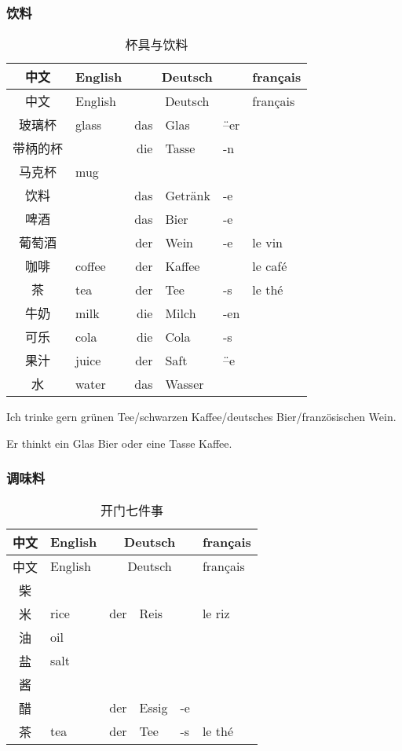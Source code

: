 \documentclass[12pt,A4paper,oneside,reqno]{amsart}
\numberwithin{equation}{section}
\theoremstyle{plain}
\theoremstyle{plain}
\theoremstyle{plain}
\numberwithin{equation}{section}
\theoremstyle{remark}
\begin{document}
\subsubsection{饮料}\hspace{1cm}
\begin{longtable}{c|l|rll|l}
	\hline
	中文	&	English	&\multicolumn{3}{c|}{Deutsch} &	français  	\\
	\hline
	\endhead
	\hline
	中文	&	English	&\multicolumn{3}{c|}{Deutsch} &	français  	\\
	\hline
	\endfirsthead	
	\hline
	\endfoot
	\hline	
	\caption{杯具与饮料}
	\endlastfoot				
玻璃杯	&	glass	&	das	&	Glas	&	\"{--}er	&		\\
带柄的杯	&		&	die	&	Tasse	&	-n	&		\\
马克杯	&	mug	&		&		&		&		\\
\hline											
饮料	&		&	das	&	Getr\"{a}nk	&	-e	&		\\
啤酒	&		&	das	&	Bier	&	-e	&		\\
葡萄酒	&		&	der	&	Wein	&	-e	&	le vin	\\
咖啡	&	coffee	&	der	&	Kaffee	&		&	le caf\'{e}	\\
茶	&	tea	&	der	&	Tee	&	-s	&	le th\'{e}	\\
牛奶	&	milk	&	die	&	Milch	&	-en	&		\\
可乐	&	cola	&	die	&	Cola	&	-s	&		\\
果汁	&	juice	&	der	&	Saft	&	\"{--}e	&		\\
水	&	water	&	das	&	Wasser	&		&		\\


\end{longtable}
Ich trinke gern gr\"{u}nen Tee/schwarzen Kaffee/deutsches Bier/franz\"{o}sischen Wein.

 Er thinkt ein Glas Bier oder eine Tasse Kaffee.
\subsubsection{调味料}\hspace{1cm}
\begin{longtable}{c|l|rll|l}
	\hline
	中文	&	English	&\multicolumn{3}{c|}{Deutsch} &	français  	\\
	\hline
	\endhead
	\hline
	中文	&	English	&\multicolumn{3}{c|}{Deutsch} &	français  	\\
	\hline
	\endfirsthead	
	\hline
	\endfoot
	\hline	
	\caption{开门七件事}
	\endlastfoot				
柴	&		&		&		&		&		\\
米	&	rice	&	der	&	Reis	&		&	le riz	\\
油	&	oil	&		&		&		&		\\
盐	&	salt	&		&		&		&		\\
酱	&		&		&		&		&		\\
醋	&		&	der	&	Essig	&	-e	&		\\
茶	&	tea	&	der	&	Tee	&	-s	&	le th\'{e}	\\

	
	
\end{longtable}
\end{document}
